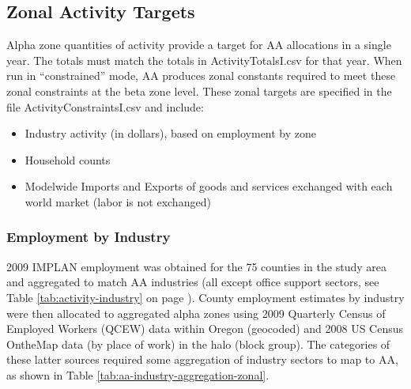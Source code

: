 

\subsection{Zonal Activity Targets}\label{sec:aa-zonal-activity-targets}
Alpha zone quantities of activity provide a target for AA allocations in a single year. The totals must match the totals in ActivityTotalsI.csv for that year.  When run in ``constrained'' mode, AA produces zonal constants required to meet these zonal constraints at the beta zone level. These zonal targets are specified in the file ActivityConstraintsI.csv and include: 
\begin{itemize}
\item Industry activity (in dollars), based on employment by zone
\item Household counts
\item Modelwide Imports and Exports of goods and services exchanged with each world market (labor 
is not exchanged)
\end{itemize}

\subsubsection{Employment by Industry}

2009 IMPLAN employment was obtained for the 75 counties in the study area and aggregated to match AA industries (all except office support sectors, see Table \ref{tab:activity-industry} on page \pageref{tab:activity-industry}). County employment estimates by industry were then allocated to aggregated alpha zones using 2009 Quarterly Census of Employed Workers (QCEW) data within Oregon (geocoded) and 2008 US Census OntheMap data (by place of work) in the halo (block group). The categories of these latter sources required some aggregation of industry sectors to map to AA, as shown in Table \ref{tab:aa-industry-aggregation-zonal}. 


